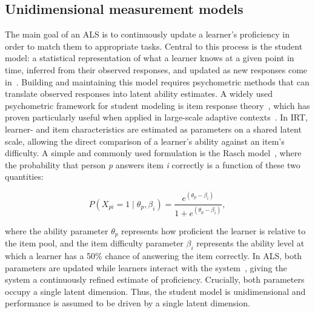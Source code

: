 \documentclass[11pt]{article}
\begin{document}
\subsection{Unidimensional measurement models}
The main goal of an ALS is to continuously update a learner's proficiency in order to match them to appropriate tasks. Central to this process is the student model: a statistical representation of what a learner knows at a given point in time, inferred from their observed responses, and updated as new responses come in~\parencite{corbett1994knowledge, deonovic2018learning, klinkenberg2011computer}. Building and maintaining this model requires psychometric methods that can translate observed responses into latent ability estimates. A widely used psychometric framework for student modeling is item response theory~\parencite[IRT;][]{hambleton1991fundamentals}, which has proven particularly useful when applied in large-scale adaptive contexts~\parencite{pelanek2016applications}. In IRT, learner- and item characteristics are estimated as parameters on a shared latent scale, allowing the direct comparison of a learner's ability against an item's difficulty. A simple and commonly used formulation is the Rasch model~\parencite{rasch1993probabilistic}, where the probability that person \textit{p} answers item \textit{i} correctly is a function of these two quantities:

\begin{equation}
P(X_{pi} = 1 \mid \theta_p, \beta_i) = \frac{e^{(\theta_p - \beta_i)}}{1 + e^{(\theta_p - \beta_i)}},
\label{eq:Rasch}
\end{equation}

\noindent where the ability parameter $\theta_p$ represents how proficient the learner is relative to the item pool, and the item difficulty parameter $\beta_i$ represents the ability level at which a learner has a 50\% chance of answering the item correctly. In ALS, both parameters are updated while learners interact with the system~\parencite[for example with the Elo-algorithm; ][]{klinkenberg2011computer}, giving the system a continuously refined estimate of proficiency. Crucially, both parameters occupy a single latent dimension. Thus, the student model is unidimensional and performance is assumed to be driven by a single latent dimension.
\end{document}
